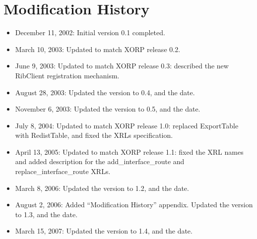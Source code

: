 \documentclass[11pt]{article}
\begin{document}
\section{Modification History}

\begin{itemize}

  \item December 11, 2002: Initial version 0.1 completed.

  \item March 10, 2003: Updated to match XORP release 0.2.

  \item June 9, 2003: Updated to match XORP release 0.3: described the new
  RibClient registration mechanism.

  \item August 28, 2003: Updated the version to 0.4, and the date.

  \item November 6, 2003: Updated the version to 0.5, and the date.

  \item July 8, 2004: Updated to match XORP release 1.0: replaced ExportTable
  with RedistTable, and fixed the XRLs specification.

  \item April 13, 2005: Updated to match XORP release 1.1: fixed the XRL names
  and added description for the add\_interface\_route and
  replace\_interface\_route XRLs.

  \item March 8, 2006: Updated the version to 1.2, and the date.

  \item August 2, 2006: Added ``Modification History'' appendix.
  Updated the version to 1.3, and the date.

  \item March 15, 2007: Updated the version to 1.4, and the date.

\end{itemize}




\end{document}

